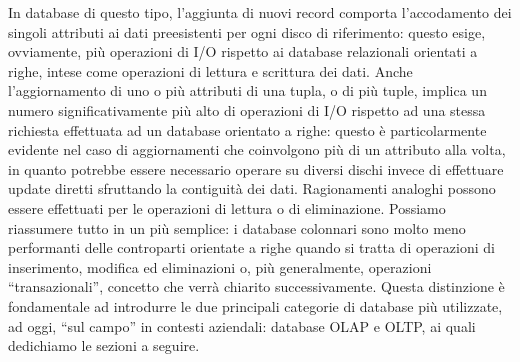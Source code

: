 \documentclass[a4paper,12pt]{report}
\begin{document}
In database di questo tipo, l’aggiunta di nuovi record comporta l’accodamento dei singoli attributi ai dati preesistenti per ogni disco di riferimento: questo esige, ovviamente, più operazioni di I/O rispetto ai database relazionali orientati a righe, intese come operazioni di lettura e scrittura dei dati. Anche l'aggiornamento di uno o più attributi di una tupla, o di più tuple, implica un numero significativamente più alto di operazioni di I/O rispetto ad una stessa richiesta effettuata ad un database orientato a righe: questo è particolarmente evidente nel caso di aggiornamenti che coinvolgono più di un attributo alla volta, in quanto potrebbe essere necessario operare su diversi dischi invece di effettuare update diretti sfruttando la contiguità dei dati. Ragionamenti analoghi possono essere effettuati per le operazioni di lettura o di eliminazione. Possiamo riassumere tutto in un più semplice: i database colonnari sono molto meno performanti delle controparti orientate a righe quando si tratta di operazioni di inserimento, modifica ed eliminazioni o, più generalmente, operazioni “transazionali”, concetto che verrà chiarito successivamente. Questa distinzione è fondamentale ad introdurre le due principali categorie di database più utilizzate, ad oggi, “sul campo” in contesti aziendali: database OLAP e OLTP, ai quali dedichiamo le sezioni a seguire.
\end{document}

